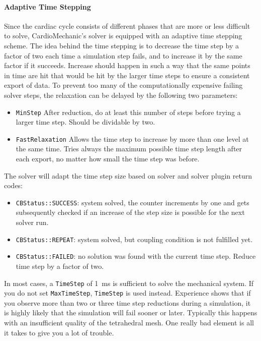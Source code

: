 \paragraph{Adaptive Time Stepping}
Since the cardiac cycle consists of different phases that are more or less difficult to solve,
CardioMechanic's solver is equipped with an adaptive time stepping scheme.
The idea behind the time stepping is to decrease the time step by a factor of two each time a simulation step fails, and to increase it by the same factor if it succeeds. 
Increase should happen in such a way that the same points in time are hit that would be hit by the larger time steps to ensure a consistent export of data.
To prevent too many of the computationally expensive failing solver steps, the relaxation can be delayed by the following two parameters:
\begin{itemize}
    \item
    \verb|MinStep| After reduction, do at least this number of steps before trying a larger time step. 
    Should be dividable by two.
    \item 
    \verb|FastRelaxation| Allows the time step to increase by more than one level at the same time. 
    Tries always the maximum possible time step length after each export, no matter how small the time step was before.
\end{itemize}
The solver will adapt the time step size based on solver and solver plugin return codes:
\begin{itemize}
    \item \verb|CBStatus::SUCCESS|: system solved, the counter increments by one and gets subsequently checked if an increase of the step size is possible for the next solver run.
    \item \verb|CBStatus::REPEAT|: system solved, but coupling condition is not fulfilled yet.
    \item \verb|CBStatus::FAILED|: no solution was found with the current time step. Reduce time step by a factor of two.
\end{itemize}
In most cases, a \verb|TimeStep| of \SI{1}{ms} is sufficient to solve the mechanical system.
If you do not set \verb|MaxTimeStep|, \verb|TimeStep| is used instead.
Experience shows that if you observe more than two or three time step reductions during a simulation, it is highly likely that the simulation will fail sooner or later.
Typically this happens with an insufficient quality of the tetrahedral mesh.
One really bad element is all it takes to give you a lot of trouble.

